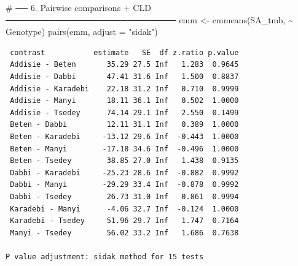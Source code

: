 \documentclass[
  letterpaper,
  DIV=11,
  numbers=noendperiod]{scrartcl}
\newenvironment{Shaded}{\begin{snugshade}}{\end{snugshade}}
\newcommand{\AttributeTok}[1]{\textcolor[rgb]{0.40,0.45,0.13}{#1}}
\newcommand{\CommentTok}[1]{\textcolor[rgb]{0.37,0.37,0.37}{#1}}
\newcommand{\FunctionTok}[1]{\textcolor[rgb]{0.28,0.35,0.67}{#1}}
\newcommand{\NormalTok}[1]{\textcolor[rgb]{0.00,0.23,0.31}{#1}}
\newcommand{\OtherTok}[1]{\textcolor[rgb]{0.00,0.23,0.31}{#1}}
\newcommand{\SpecialCharTok}[1]{\textcolor[rgb]{0.37,0.37,0.37}{#1}}
\newcommand{\StringTok}[1]{\textcolor[rgb]{0.13,0.47,0.30}{#1}}
\begin{document}
\begin{Shaded}
\begin{Highlighting}[]
\CommentTok{\# ── 6. Pairwise comparisons + CLD ────────────────────────────}
\NormalTok{emm }\OtherTok{\textless{}{-}} \FunctionTok{emmeans}\NormalTok{(SA\_tmb, }\SpecialCharTok{\textasciitilde{}}\NormalTok{ Genotype)}
\FunctionTok{pairs}\NormalTok{(emm, }\AttributeTok{adjust =} \StringTok{"sidak"}\NormalTok{)}
\end{Highlighting}
\end{Shaded}

\begin{verbatim}
 contrast           estimate   SE  df z.ratio p.value
 Addisie - Beten       35.29 27.5 Inf   1.283  0.9645
 Addisie - Dabbi       47.41 31.6 Inf   1.500  0.8837
 Addisie - Karadebi    22.18 31.2 Inf   0.710  0.9999
 Addisie - Manyi       18.11 36.1 Inf   0.502  1.0000
 Addisie - Tsedey      74.14 29.1 Inf   2.550  0.1499
 Beten - Dabbi         12.11 31.1 Inf   0.389  1.0000
 Beten - Karadebi     -13.12 29.6 Inf  -0.443  1.0000
 Beten - Manyi        -17.18 34.6 Inf  -0.496  1.0000
 Beten - Tsedey        38.85 27.0 Inf   1.438  0.9135
 Dabbi - Karadebi     -25.23 28.6 Inf  -0.882  0.9992
 Dabbi - Manyi        -29.29 33.4 Inf  -0.878  0.9992
 Dabbi - Tsedey        26.73 31.0 Inf   0.861  0.9994
 Karadebi - Manyi      -4.06 32.7 Inf  -0.124  1.0000
 Karadebi - Tsedey     51.96 29.7 Inf   1.747  0.7164
 Manyi - Tsedey        56.02 33.2 Inf   1.686  0.7638

P value adjustment: sidak method for 15 tests 
\end{verbatim}
\end{document}
